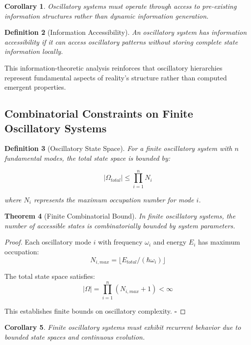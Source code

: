 \documentclass[11pt]{article}
\newtheorem{theorem}{Theorem}[section]
\newtheorem{corollary}[theorem]{Corollary}
\newtheorem{definition}[theorem]{Definition}
\theoremstyle{remark}
\begin{document}
\begin{corollary}
Oscillatory systems must operate through access to pre-existing information structures rather than dynamic information generation.
\end{corollary}

\begin{definition}[Information Accessibility]
An oscillatory system has information accessibility if it can access oscillatory patterns without storing complete state information locally.
\end{definition}

This information-theoretic analysis reinforces that oscillatory hierarchies represent fundamental aspects of reality's structure rather than computed emergent properties.

\subsection{Combinatorial Constraints on Finite Oscillatory Systems}

\begin{definition}[Oscillatory State Space]
For a finite oscillatory system with $n$ fundamental modes, the total state space is bounded by:

$$|\Omega_{total}| \leq \prod_{i=1}^{n} N_i$$

where $N_i$ represents the maximum occupation number for mode $i$.
\end{definition}

\begin{theorem}[Finite Combinatorial Bound]
In finite oscillatory systems, the number of accessible states is combinatorially bounded by system parameters.
\end{theorem}

\begin{proof}
Each oscillatory mode $i$ with frequency $\omega_i$ and energy $E_i$ has maximum occupation:
$$N_{i,max} = \lfloor E_{total}/(\hbar\omega_i) \rfloor$$

The total state space satisfies:
$$|\Omega| = \prod_{i=1}^{n} (N_{i,max} + 1) < \infty$$

This establishes finite bounds on oscillatory complexity. $\square$
\end{proof}

\begin{corollary}
Finite oscillatory systems must exhibit recurrent behavior due to bounded state spaces and continuous evolution.
\end{corollary}
\end{document}
